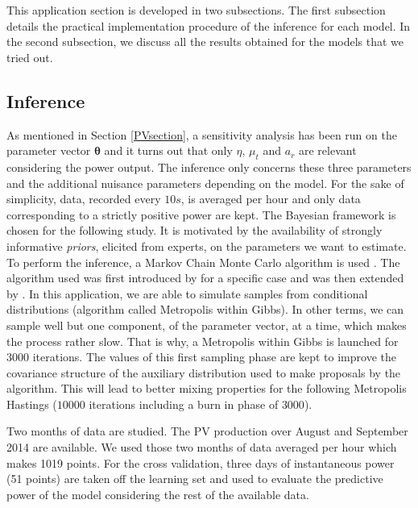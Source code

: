\documentclass[soumission]{jsfds}
\begin{document}
This application section is developed in two subsections. The first subsection details the practical implementation procedure of the inference for each model. In the second subsection, we discuss all the results obtained for the models that we tried out.\newline

\subsection{Inference \label{Inference}}
As mentioned in Section \ref{PVsection}, a sensitivity analysis has been run on the parameter vector $\boldsymbol{\theta}$ and it turns out that only $\eta$, $\mu_t$ and $a_r$ are relevant considering the power output. The inference only concerns these three parameters and the additional nuisance parameters depending on the model. For the sake of simplicity, data, recorded every $10s$, is averaged per hour and only data corresponding to a strictly positive power are kept. The Bayesian framework is chosen for the following study. It is motivated by the availability of strongly informative \textit{priors}, elicited from experts, on the parameters we want to estimate. To perform the inference, a Markov Chain Monte Carlo algorithm is used \citep{robert1996}. The algorithm used was first introduced by
\citet{metropolis1953} for a specific case and was then extended by \citet{Hastings1970}. In this application, we are able to simulate samples
from conditional distributions (algorithm called Metropolis within Gibbs). In other terms, we can sample well but one component, of the parameter vector, 
at a time, which makes the process rather slow. That is why, a Metropolis within Gibbs is launched for $3000$ iterations.
The values of this first sampling phase are kept to improve the covariance structure of the auxiliary distribution used to make proposals by the algorithm.
This will lead to better mixing properties for the following Metropolis Hastings ($10000$ iterations including a burn in phase of $3000$).\newline

Two months of data are studied. The PV production over August and September 2014 are available. We used those two months of data averaged per hour which makes 1019 points. For the cross validation, three days of instantaneous power (51 points) are taken off the learning set and used to evaluate the predictive power of the model considering the rest of the available data. \newline
\end{document}

